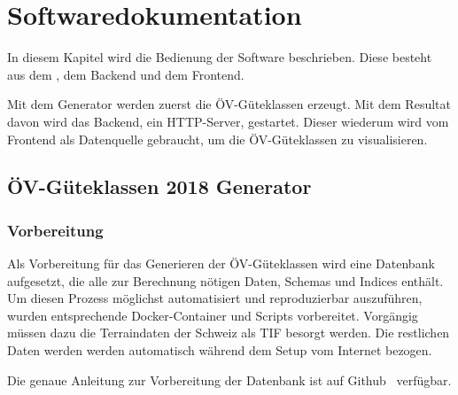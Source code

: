 
\section{Softwaredokumentation}
\label{Softwaredokumentation}

In diesem Kapitel wird die Bedienung der Software beschrieben.
Diese besteht aus dem , dem Backend und dem Frontend.

Mit dem Generator werden zuerst die \ac{ÖV}-Güteklassen erzeugt.
Mit dem Resultat davon wird das Backend, ein HTTP-Server, gestartet.
Dieser wiederum wird vom Frontend als Datenquelle gebraucht, um die \acs{ÖV}-Güteklassen zu visualisieren.

\subsection{ÖV-Güteklassen 2018 Generator}
\label{Softwaredokumentation: ÖV-Güteklassen 2018 Generator}

\subsubsection{Vorbereitung}
\label{Softwaredokumentation:Vorbereitung}
Als Vorbereitung für das Generieren der \ac{ÖV}-Güteklassen wird eine Datenbank aufgesetzt, die alle zur Berechnung nötigen Daten, Schemas und Indices enthält.
Um diesen Prozess möglichst automatisiert und reproduzierbar auszuführen, wurden entsprechende Docker-Container und Scripts vorbereitet.
Vorgängig müssen dazu die Terraindaten der Schweiz als TIF besorgt werden.
Die restlichen Daten werden werden automatisch während dem Setup vom Internet bezogen.

Die genaue Anleitung zur Vorbereitung der Datenbank ist auf Github~\cite{github_docker_setup} verfügbar.

